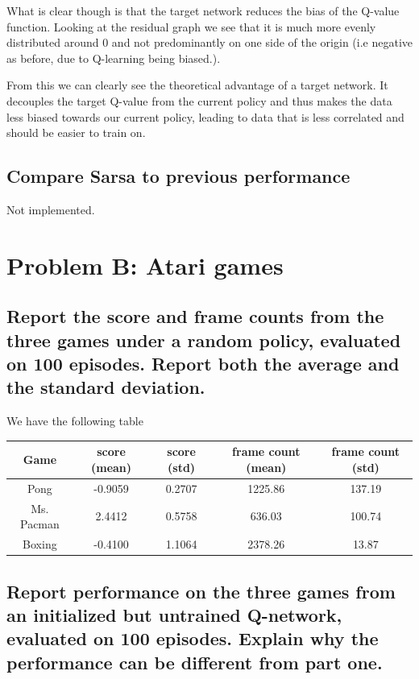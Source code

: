\documentclass{article}
\begin{document}
What is clear though is that the target network reduces the bias of the Q-value
function. Looking at the residual graph we see that it is much more evenly
distributed around 0 and not predominantly on one side of the origin (i.e
negative as before, due to Q-learning being biased.).

From this we can clearly see the theoretical advantage of a target network. It
decouples the target Q-value from the current policy and thus makes the data
less biased towards our current policy, leading to data that is less correlated
and should be easier to train on.

\subsection{Compare Sarsa to previous performance}

Not implemented.

\newpage

\section{Problem B: Atari games}

\subsection{Report the score and frame counts from the three games under a
  random policy, evaluated on 100 episodes. Report both the average and the
  standard deviation.}

We have the following table

\begin{center}
  \begin{tabular}{ |c|c|c|c|c| } 
    \hline
    Game & score (mean) & score (std) & frame count (mean) & frame count (std) \\
    \hline
    Pong & -0.9059 & 0.2707 & 1225.86 & 137.19 \\
    \hline
    Ms. Pacman & 2.4412 & 0.5758 & 636.03 & 100.74 \\
    \hline
    Boxing & -0.4100 & 1.1064 & 2378.26 & 13.87 \\
    \hline
  \end{tabular}
\end{center}

\subsection{Report performance on the three games from an initialized but
  untrained Q-network, evaluated on 100 episodes. Explain why the performance
  can be different from part one.}
\end{document}
